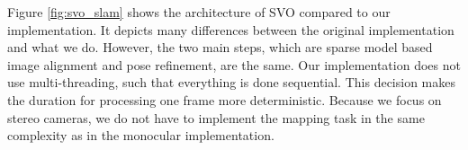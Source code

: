 \documentclass[11pt,a4paper,titlepage,oneside]{report}
\begin{document}
Figure \ref{fig:svo_slam} shows the architecture of SVO compared to our implementation. It depicts many differences between the original implementation and what we do. However, the two main steps, which are sparse model based image alignment and pose refinement, are the same. Our implementation does not use multi-threading, such that everything is done sequential. This decision makes the duration for processing one frame more deterministic. Because we focus on stereo cameras, we do not have to implement the mapping task in the same complexity as in the monocular implementation.

\begin{figure}[H]
  \centering
  \qquad

\end{figure}
\end{document}
